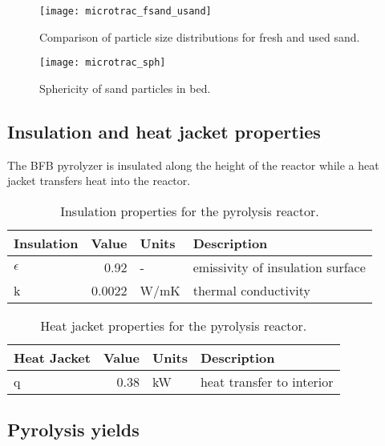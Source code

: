 \begin{figure}[H]
    \centering
    \texttt{[image: microtrac\_fsand\_usand]}
    \caption{Comparison of particle size distributions for fresh and used sand.}
    \label{fig:fsand-usand}
\end{figure}

\begin{figure}[H]
    \centering
    \texttt{[image: microtrac\_sph]}
    \caption{Sphericity of sand particles in bed.}
    \label{fig:sph}
\end{figure}

\subsection{Insulation and heat jacket properties}

The BFB pyrolyzer is insulated along the height of the reactor while a heat jacket transfers heat into the reactor.

\begin{table}[H]
    \centering
    \caption{Insulation properties for the pyrolysis reactor.}
    \label{tab:insulation}
    \begin{tabular}{lrll}
        \toprule
        Insulation & Value & Units & Description \\
        \midrule
        $\epsilon$ & 0.92 & - & emissivity of insulation surface \\
        k & 0.0022 & W/mK & thermal conductivity \\
        \bottomrule
    \end{tabular}
\end{table}

\begin{table}[H]
    \centering
    \caption{Heat jacket properties for the pyrolysis reactor.}
    \label{tab:heatjacket}
    \begin{tabular}{lrll}
        \toprule
        Heat Jacket & Value & Units & Description \\
        \midrule
        q & 0.38 & kW & heat transfer to interior \\
        \bottomrule
    \end{tabular}
\end{table}

\subsection{Pyrolysis yields}

